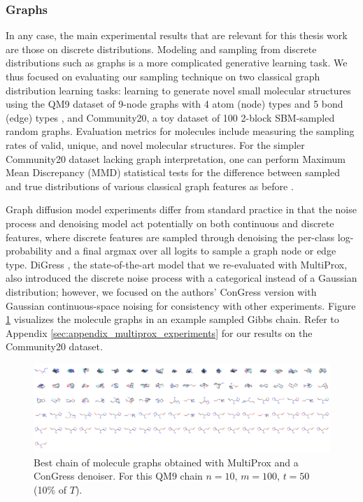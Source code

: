 \subsubsection{Graphs}
In any case, the main experimental results that are relevant for this thesis work are those on discrete distributions. Modeling and sampling from discrete distributions such as graphs is a more complicated generative learning task. We thus focused on evaluating our sampling technique on two classical graph distribution learning tasks: learning to generate novel small molecular structures using the QM9 dataset of 9-node graphs with 4 atom (node) types and 5 bond (edge) types \cite{ruddigkeit_enumeration_2012, ramakrishnan_quantum_2014}, and Community20, a toy dataset of 100 2-block SBM-sampled random graphs. Evaluation metrics for molecules include measuring the sampling rates of valid, unique, and novel molecular structures. For the simpler Community20 dataset lacking graph interpretation, one can perform Maximum Mean Discrepancy (MMD) statistical tests for the difference between sampled and true distributions of various classical graph features as before \cite{gretton_kernel_2012, liao_efficient_2019}.

Graph diffusion model experiments differ from standard practice in that the noise process and denoising model act potentially on both continuous and discrete features, where discrete features are sampled through denoising the per-class log-probability and a final argmax over all logits to sample a graph node or edge type. DiGress \cite{vignac_digress_2022}, the state-of-the-art model that we re-evaluated with MultiProx, also introduced the discrete noise process with a categorical instead of a Gaussian distribution; however, we focused on the authors' ConGress version with Gaussian continuous-space noising for consistency with other experiments. Figure \ref{fig:multiprox_qm9} visualizes the molecule graphs in an example sampled Gibbs chain. Refer to Appendix \ref{sec:appendix_multiprox_experiments} for our results on the Community20 dataset. 

\begin{figure}[H]
    \centering
    \includegraphics[width=\linewidth]{figures/multiprox/qm9_grid_image_single_noise.png}
    \caption[Best chain of molecule graphs obtained with MultiProx.]{Best chain of molecule graphs obtained with MultiProx and a ConGress denoiser. For this QM9 chain $n=10$, $m=100$, $t=50$ (10\% of $T$).
    }
    \label{fig:multiprox_qm9}
\end{figure}

